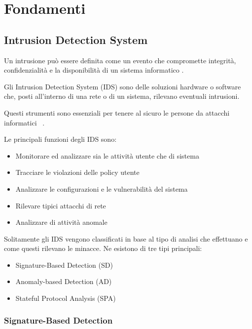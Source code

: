 \chapter{Fondamenti}

\section{Intrusion Detection System}


Un intrusione può essere definita come un evento che compromette integrità, confidenzialità e la disponibilità di un sistema informatico \cite{biermannComparisonIntrusionDetection2001}.

Gli Intrusion Detection System (IDS) sono delle soluzioni hardware o software che, posti all'interno di una rete o di un sistema, rilevano eventuali intrusioni. 

Questi strumenti sono essenziali per tenere al sicuro le persone da attacchi informatici ~\cite{SurveyIntrusionDetection2019}.

\cite{ashoorImportanceIntrusionDetection2010} Le principali funzioni degli IDS sono: 

\begin{itemize}
    \item Monitorare ed analizzare sia le attività utente che di sistema
    \item Tracciare le violazioni delle policy utente
    \item Analizzare le configurazioni e le vulnerabilità del sistema
    \item Rilevare tipici attacchi di rete
    \item Analizzare di attività anomale
\end{itemize}


\cite{liaoIntrusionDetectionSystem2013} Solitamente gli IDS vengono classificati in base al tipo di analisi che effettuano e come questi rilevano le minacce. Ne esistono di tre tipi principali:


\begin{itemize}
    \item Signature-Based Detection (SD)
    \item Anomaly-based Detection (AD)
    \item Stateful Protocol Analysis (SPA)
\end{itemize}



\subsection{Signature-Based Detection}

